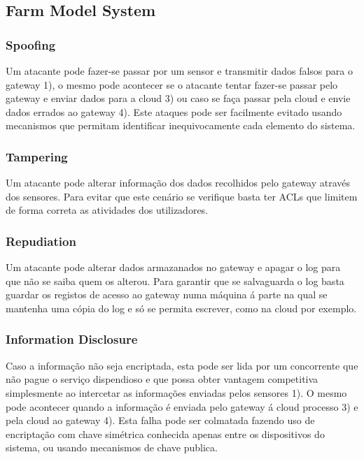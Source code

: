 \subsection{Farm Model System}


\subsubsection{Spoofing}
\par\hfill
\par  Um atacante pode fazer-se passar por um sensor e transmitir dados falsos para o gateway 1), o mesmo pode acontecer se o atacante tentar fazer-se passar pelo gateway e enviar dados para a cloud 3) ou caso se faça passar pela cloud e envie dados errados ao gateway 4). Este ataques pode ser facilmente evitado usando mecanismos que permitam identificar inequivocamente cada elemento do sistema.\newline

\subsubsection{Tampering}
\par\hfill
\par Um atacante pode alterar informação dos dados recolhidos pelo gateway através dos sensores. Para evitar que este cenário se verifique basta ter ACLs que limitem de forma correta as atividades dos utilizadores.


\subsubsection{Repudiation}
\par\hfill
\par Um atacante pode alterar dados armazanados no gateway e apagar o log para que não se saiba quem os alterou. Para garantir que se salvaguarda o log basta guardar os registos de acesso ao gateway numa máquina á parte na qual se mantenha uma cópia do log e só se permita escrever, como na cloud por exemplo.

\subsubsection{Information Disclosure}
\par\hfill
\par Caso a informação não seja encriptada, esta pode ser lida por um concorrente que não pague o serviço dispendioso e que possa obter vantagem competitiva simplesmente ao intercetar as informações enviadas pelos sensores 1). O mesmo pode acontecer quando a informação é enviada pelo gateway á cloud processo 3) e pela cloud ao gateway 4). Esta falha pode ser colmatada fazendo uso de encriptação com chave simétrica conhecida apenas entre os dispositivos do sistema, ou usando mecanismos de chave publica.\newline

